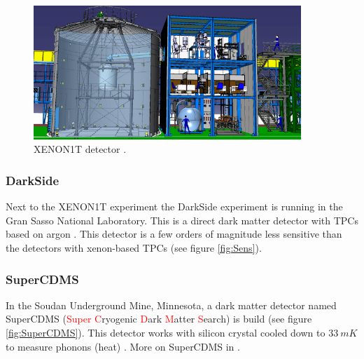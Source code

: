 \documentclass{article}
\begin{document}
\begin{figure}[h]
    \centering
    \includegraphics[width=0.9\textwidth]{Xenon1T.png}
    \caption{XENON1T detector \cite{Perdue}.}
    \label{fig:XENON1T}
\end{figure}

\subsubsection{DarkSide}
\label{sec:DarkSide}Next to the XENON1T experiment the DarkSide experiment is running in the Gran Sasso National Laboratory. This is a direct dark matter detector with TPCs based on argon \cite{Agnes:2015ftt, Agnes:2018mon, Edkins:2017qct}. This detector is a few orders of magnitude less sensitive than the detectors with xenon-based TPCs (see figure \ref{fig:Sens}).

\subsubsection{SuperCDMS}
\label{sec:SuperCDMS}In the Soudan Underground Mine, Minnesota, a dark matter detector named SuperCDMS (\textcolor{red}{Super} \textcolor{red}{C}ryogenic \textcolor{red}{D}ark \textcolor{red}{M}atter \textcolor{red}{S}earch) is build (see figure \ref{fig:SuperCDMS}). This detector works with silicon crystal cooled down to $33\ mK$ to measure phonons (heat) \cite{Agnese:2018col}. More on SuperCDMS in \cite{Agnese:2013jaa, Agnese:2014aze, Agnese:2015nto}.
\end{document}
